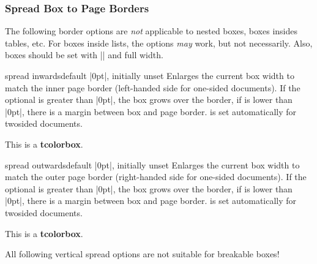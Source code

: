 \clearpage
\subsubsection{Spread Box to Page Borders}

\begin{marker}
The following border options are \emph{not} applicable to nested boxes, boxes insides
tables, etc.
For boxes inside lists, the options \emph{may} work, but not necessarily.
Also, boxes should be set with |\noindent| and full width.
\end{marker}

\begin{docTcbKey}[][doc new=2017-02-13]{spread inwards}{}{default |0pt|, initially unset}
Enlarges the current box width to match the inner page border (left-handed side for one-sided
documents). If the optional  is greater than |0pt|, the box
grows over the border, if  is lower than |0pt|, there is a
margin between box and page border.
 is set automatically for twosided documents.
\begin{dispListing}
\begin{tcolorbox}[enhanced,spread inwards,
  colframe=blue!75!black,colback=white,show bounding box]
This is a \textbf{tcolorbox}.
\end{tcolorbox}
\end{dispListing}
{\tcbusetemp}
\end{docTcbKey}

\begin{docTcbKey}[][doc new=2017-02-13]{spread outwards}{}{default |0pt|, initially unset}
Enlarges the current box width to match the outer page border (right-handed side for one-sided
documents). If the optional  is greater than |0pt|, the box
grows over the border, if  is lower than |0pt|, there is a
margin between box and page border.
 is set automatically for twosided documents.
\begin{dispListing}
\begin{tcolorbox}[enhanced,spread outwards,
  colframe=blue!75!black,colback=white,show bounding box]
This is a \textbf{tcolorbox}.
\end{tcolorbox}
\end{dispListing}
{\tcbusetemp}
\end{docTcbKey}

\begin{marker}
All following vertical spread options are not suitable for breakable boxes!
\end{marker}

